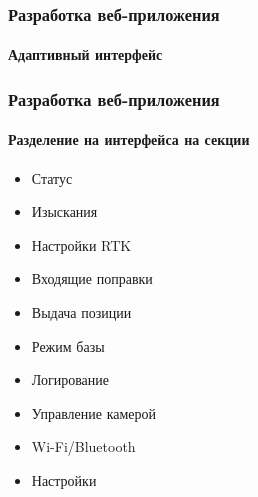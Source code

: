 \documentclass[xetex,t]{beamer}
\begin{document}
%
%
\begin{frame}
  \frametitle{Разработка веб-приложения}
  \framesubtitle{Адаптивный интерфейс}
\end{frame}



%
%
\begin{frame}
  \frametitle{Разработка веб-приложения}
  \framesubtitle{Разделение на интерфейса на секции}

  \begin{minipage}[c]{\textwidth}
    \centering
    \footnotesize
    \vskip 0.5cm
    \begin{minipage}[c]{.32\textwidth}
      \begin{itemize}
        \item<1> Статус
        \item<2> Изыскания
        \item<3> Настройки RTK
        \item<4> Входящие поправки
        \item<5> Выдача позиции
        \item<6> Режим базы
        \item<7> Логирование
        \item<8> Управление камерой
        \item<9> Wi-Fi/Bluetooth
        \item<10> Настройки
      \end{itemize}
    \end{minipage}
    \hspace{1em}
    \begin{minipage}[c]{.64\textwidth}
    \end{minipage}
  \end{minipage}
\end{frame}
\end{document}
